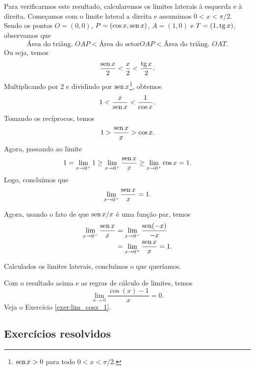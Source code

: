 Para verificarmos este resultado, calcularemos os limites laterais à esquerda e à direita. Começamos com o limite lateral a direita e assumimos $0<x<\pi/2$. Sendo os pontos $O=(0,0)$, $P=(\cos x,\operatorname{sen} x)$, $A = (1,0)$ e $T = (1, \operatorname{tg} x)$, observamos que
\begin{equation}
  \text{Área do triâng. } OAP < \text{Área do setor} OAP < \text{Área do triâng. } OAT.
\end{equation}
Ou seja, temos
\begin{equation}
  \frac{\operatorname{sen} x}{2} < \frac{x}{2} < \frac{\operatorname{tg} x}{2}.
\end{equation}
Multiplicando por $2$ e dividindo por $\operatorname{sen} x$\footnote{$\operatorname{sen} x > 0$ para todo $0< x < \pi/2$.}, obtemos
\begin{equation}
  1 < \frac{x}{\operatorname{sen} x} < \frac{1}{\cos x}.
\end{equation}
Tomando os recíprocos, temos
\begin{equation}
  1 > \frac{\operatorname{sen} x}{x} > \cos x.
\end{equation}
Agora, passando ao limite
\begin{equation}
  1 = \lim_{x\to 0^+} 1 \geq \lim_{x\to 0^+} \frac{\operatorname{sen} x}{x} \geq \lim_{x\to 0^+} \cos x = 1.
\end{equation}
Logo, concluímos que
\begin{equation}
  \lim_{x\to 0^+} \frac{\operatorname{sen} x}{x} = 1.
\end{equation}

Agora, usando o fato de que $\operatorname{sen} x/x$ é uma função par, temos
\begin{align}
  \lim_{x\to 0^-} \frac{\operatorname{sen} x}{x} &= \lim_{x\to 0^-} \frac{\operatorname{sen}(-x)}{-x} \\
  &= \lim_{x\to 0^+} \frac{\operatorname{sen} x}{x} = 1.
\end{align}

Calculados os limites laterais, concluímos o que queríamos.

\begin{ex}
  Com o resultado acima e as regras de cálculo de limites, temos
  \begin{equation}
    \lim_{x\to 0} \frac{\cos(x) - 1}{x} = 0.
  \end{equation}
  Veja o Exercício \ref{exer:lim_cosx_1}.
\end{ex}

\subsection*{Exercícios resolvidos}


